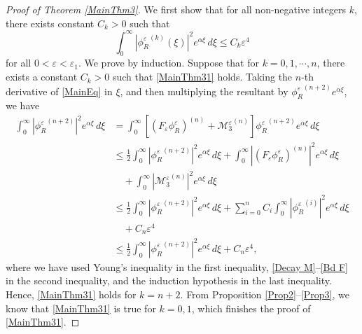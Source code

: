 \documentclass{amsart}
\newcommand{\veps}{\varepsilon}
\numberwithin{equation}{section}
\theoremstyle{plain}%
\theoremstyle{definition}
\theoremstyle{remark}
\theoremstyle{remark}
\begin{document}
\begin{proof}[Proof of Theorem \ref{MainThm3}]
We first show that for all non-negative integers $k$, there exists constant $C_k>0$ such that 
\begin{equation}\label{MainThm31}
\int_0^\infty |{\phi_R^\veps}^{(k)}(\xi)|^2 e^{\alpha\xi}\,d\xi \leq C_k \veps^4
\end{equation}
for all $0<\veps<\veps_1$.
We prove by induction. Suppose that for $k=0,1,\cdots,n$, there exists a constant $C_k>0$ such that \eqref{MainThm31} holds.
Taking the $n$-th derivative of \eqref{MainEq} in $\xi$, and then multiplying the resultant by ${\phi_R^\veps}^{(n+2)}e^{\alpha\xi}$, we have
\[
\begin{split}
\int_0^\infty |{\phi_R^\veps}^{(n+2)}|^2e^{\alpha\xi}\,d\xi
&  = \int_0^\infty\left[(F_\veps\phi_R^\veps)^{(n)} + {\mathcal{M}_3^\veps}^{(n)}\right]{\phi_R^\veps}^{(n+2)}e^{\alpha\xi}\,d\xi \\
& \leq \frac{1}{2}\int_0^\infty|{\phi_R^\veps}^{(n+2)}|^2e^{\alpha\xi}\,d\xi +  \int_0^\infty |(F_\veps\phi_R^\veps)^{(n)}|^2 e^{\alpha\xi}\,d\xi \\
&\quad  + \int_0^\infty|{\mathcal{M}_3^\veps}^{(n)}|^2 e^{\alpha\xi}\,d\xi\\ 
& \leq \frac{1}{2}\int_0^\infty|{\phi_R^\veps}^{(n+2)}|^2e^{\alpha\xi}\,d\xi +   \sum_{i=0}^nC_i\int_0^\infty |{\phi_R^\veps}^{(i)}|^2e^{\alpha\xi}\,d\xi\\
& \quad + C_n \veps^4 \\
& \leq \frac{1}{2}\int_0^\infty|{\phi_R^\veps}^{(n+2)}|^2e^{\alpha\xi}\,d\xi + C_n \veps^4,
\end{split}
\]
where we have used Young's inequality in the first inequality, \eqref{Decay M}--\eqref{Bd F} in the second inequality, and the induction hypothesis in the last inequality.
Hence, \eqref{MainThm31} holds for $k=n+2$. From Proposition \ref{Prop2}--\ref{Prop3}, we know that \eqref{MainThm31} is true for $k=0,1$, which finishes the proof of \eqref{MainThm31}.


\end{proof}
\end{document}

